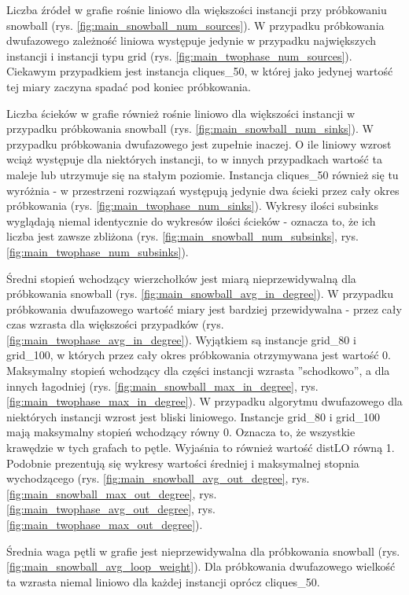 Liczba źródeł w grafie rośnie liniowo dla większości instancji przy próbkowaniu snowball (rys. \ref{fig:main_snowball_num_sources}).
W przypadku próbkowania dwufazowego zależność liniowa występuje jedynie w przypadku największych instancji i instancji typu grid (rys. \ref{fig:main_twophase_num_sources}).
Ciekawym przypadkiem jest instancja cliques\_50, w której jako jedynej wartość tej miary zaczyna spadać pod koniec próbkowania.

Liczba ścieków w grafie również rośnie liniowo dla większości instancji w przypadku próbkowania snowball (rys. \ref{fig:main_snowball_num_sinks}).
W przypadku próbkowania dwufazowego jest zupełnie inaczej. O ile liniowy wzrost wciąż występuje dla niektórych instancji, to w innych przypadkach
wartość ta maleje lub utrzymuje się na stałym poziomie. Instancja cliques\_50 również się tu wyróżnia - w przestrzeni rozwiązań występują jedynie dwa ścieki
przez cały okres próbkowania (rys. \ref{fig:main_twophase_num_sinks}).
Wykresy ilości subsinks wyglądają niemal identycznie do wykresów ilości ścieków - oznacza to, że ich liczba jest zawsze zbliżona
(rys. \ref{fig:main_snowball_num_subsinks}, rys. \ref{fig:main_twophase_num_subsinks}).

Średni stopień wchodzący wierzchołków jest miarą nieprzewidywalną dla próbkowania snowball (rys. \ref{fig:main_snowball_avg_in_degree}).
W przypadku próbkowania dwufazowego wartość miary jest bardziej przewidywalna - przez cały czas wzrasta dla większości przypadków (rys. \ref{fig:main_twophase_avg_in_degree}).
Wyjątkiem są instancje grid\_80 i grid\_100, w których przez cały okres próbkowania otrzymywana jest wartość 0.
Maksymalny stopień wchodzący dla części instancji wzrasta ''schodkowo'', a dla innych łagodniej (rys. \ref{fig:main_snowball_max_in_degree}, rys. \ref{fig:main_twophase_max_in_degree}).
W przypadku algorytmu dwufazowego dla niektórych instancji wzrost jest bliski liniowego.
Instancje grid\_80 i grid\_100 mają maksymalny stopień wchodzący równy 0.
Oznacza to, że wszystkie krawędzie w tych grafach to pętle. Wyjaśnia to również wartość distLO równą 1.
Podobnie prezentują się wykresy wartości średniej i maksymalnej stopnia wychodzącego
(rys. \ref{fig:main_snowball_avg_out_degree}, rys. \ref{fig:main_snowball_max_out_degree}, rys. \ref{fig:main_twophase_avg_out_degree}, rys. \ref{fig:main_twophase_max_out_degree}).

Średnia waga pętli w grafie jest nieprzewidywalna dla próbkowania snowball (rys. \ref{fig:main_snowball_avg_loop_weight}).
Dla próbkowania dwufazowego wielkość ta wzrasta niemal liniowo dla każdej instancji oprócz cliques\_50.

